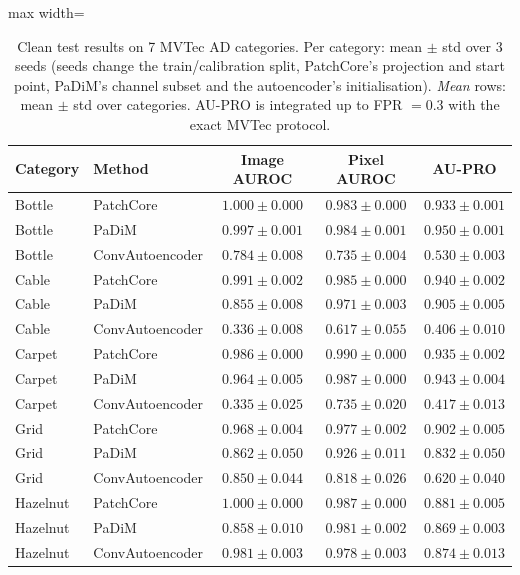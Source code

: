 \begin{table}[tbp]
\centering
\small
\caption{Clean test results on 7 MVTec AD categories. Per category: mean $\pm$ std over 3 seeds (seeds change the train/calibration split, PatchCore's projection and start point, PaDiM's channel subset and the autoencoder's initialisation). \textit{Mean} rows: mean $\pm$ std over categories. AU-PRO is integrated up to FPR $=0.3$ with the exact MVTec protocol.}
\label{tab:main_results}
\begin{adjustbox}{max width=\linewidth}
\begin{tabular}{llccc}
\toprule
\textbf{Category} & \textbf{Method} & \textbf{Image AUROC} & \textbf{Pixel AUROC} & \textbf{AU-PRO} \\
\midrule
Bottle & PatchCore & $1.000 \pm 0.000$ & $0.983 \pm 0.000$ & $0.933 \pm 0.001$ \\
Bottle & PaDiM & $0.997 \pm 0.001$ & $0.984 \pm 0.001$ & $0.950 \pm 0.001$ \\
Bottle & ConvAutoencoder & $0.784 \pm 0.008$ & $0.735 \pm 0.004$ & $0.530 \pm 0.003$ \\
\midrule
Cable & PatchCore & $0.991 \pm 0.002$ & $0.985 \pm 0.000$ & $0.940 \pm 0.002$ \\
Cable & PaDiM & $0.855 \pm 0.008$ & $0.971 \pm 0.003$ & $0.905 \pm 0.005$ \\
Cable & ConvAutoencoder & $0.336 \pm 0.008$ & $0.617 \pm 0.055$ & $0.406 \pm 0.010$ \\
\midrule
Carpet & PatchCore & $0.986 \pm 0.000$ & $0.990 \pm 0.000$ & $0.935 \pm 0.002$ \\
Carpet & PaDiM & $0.964 \pm 0.005$ & $0.987 \pm 0.000$ & $0.943 \pm 0.004$ \\
Carpet & ConvAutoencoder & $0.335 \pm 0.025$ & $0.735 \pm 0.020$ & $0.417 \pm 0.013$ \\
\midrule
Grid & PatchCore & $0.968 \pm 0.004$ & $0.977 \pm 0.002$ & $0.902 \pm 0.005$ \\
Grid & PaDiM & $0.862 \pm 0.050$ & $0.926 \pm 0.011$ & $0.832 \pm 0.050$ \\
Grid & ConvAutoencoder & $0.850 \pm 0.044$ & $0.818 \pm 0.026$ & $0.620 \pm 0.040$ \\
\midrule
Hazelnut & PatchCore & $1.000 \pm 0.000$ & $0.987 \pm 0.000$ & $0.881 \pm 0.005$ \\
Hazelnut & PaDiM & $0.858 \pm 0.010$ & $0.981 \pm 0.002$ & $0.869 \pm 0.003$ \\
Hazelnut & ConvAutoencoder & $0.981 \pm 0.003$ & $0.978 \pm 0.003$ & $0.874 \pm 0.013$ \\

\end{tabular}
\end{adjustbox}
\end{table}
